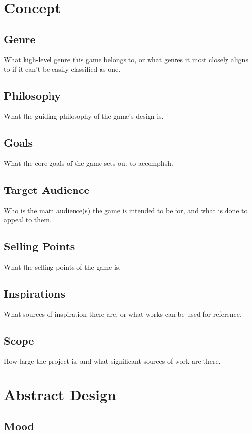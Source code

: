 

\newcommand*{\img}[1]{%
    \raisebox{-.15\baselineskip}{%
        \texttt{[image: \#1]}%
    }%
}



\section{Concept}
\subsection{Genre}
What high-level genre this game belongs to, or what genres it most closely aligns to if it can't be easily classified as one.
\subsection{Philosophy}
What the guiding philosophy of the game's design is.
\subsection{Goals}
What the core goals of the game sets out to accomplish.
\subsection{Target Audience}
Who is the main audience(s) the game is intended to be for, and what is done to appeal to them.
\subsection{Selling Points}
What the selling points of the game is.
\subsection{Inspirations}
What sources of inspiration there are, or what works can be used for reference.
\subsection{Scope}
How large the project is, and what significant sources of work are there.

\section{Abstract Design}
\subsection{Mood}
